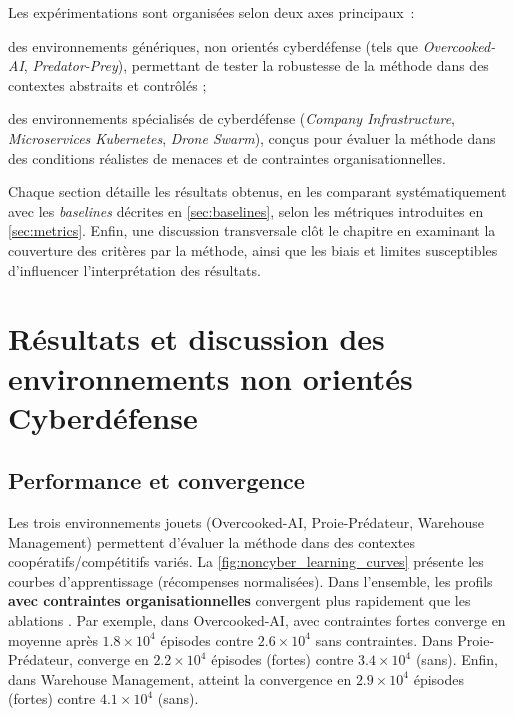 Les expérimentations sont organisées selon deux axes principaux~:
\begin{enumerate*}[label={\roman*)}, itemjoin={; \quad}]
  \item des environnements génériques, non orientés cyberdéfense (tels que \textit{Overcooked-AI}, \textit{Predator-Prey}), permettant de tester la robustesse de la méthode dans des contextes abstraits et contrôlés ;
  \item des environnements spécialisés de cyberdéfense (\textit{Company Infrastructure}, \textit{Microservices Kubernetes}, \textit{Drone Swarm}), conçus pour évaluer la méthode dans des conditions réalistes de menaces et de contraintes organisationnelles.
\end{enumerate*}

Chaque section détaille les résultats obtenus, en les comparant systématiquement avec les \textit{baselines} décrites en \autoref{sec:baselines}, selon les métriques introduites en \autoref{sec:metrics}.
Enfin, une discussion transversale clôt le chapitre en examinant la couverture des critères par la méthode, ainsi que les biais et limites susceptibles d’influencer l’interprétation des résultats.

\section{Résultats et discussion des environnements non orientés Cyberdéfense}\label{sec:results_and_discussion_cyberdefense}

\subsection*{Performance et convergence}

Les trois environnements jouets (Overcooked-AI, Proie-Prédateur, Warehouse Management) permettent d’évaluer la méthode  dans des contextes coopératifs/compétitifs variés.
La \autoref{fig:noncyber_learning_curves} présente les courbes d’apprentissage (récompenses normalisées).
Dans l’ensemble, les profils \textbf{avec contraintes organisationnelles} convergent plus rapidement que les ablations \texttt{}.
Par exemple, dans Overcooked-AI,  avec contraintes fortes converge en moyenne après $1.8\times 10^4$ épisodes contre $2.6\times 10^4$ sans contraintes.
Dans Proie-Prédateur,  converge en $2.2\times 10^4$ épisodes (fortes) contre $3.4\times 10^4$ (sans).
Enfin, dans Warehouse Management,  atteint la convergence en $2.9\times 10^4$ épisodes (fortes) contre $4.1\times 10^4$ (sans).

